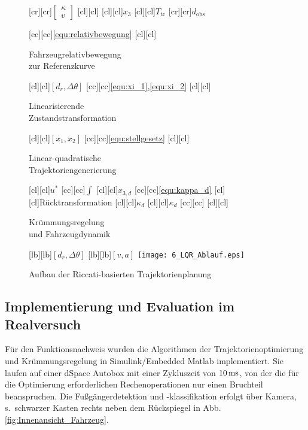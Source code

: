 \begin{figure}
\centering
	[cr][cr]{$\begin{bmatrix} \kappa \\ v \end{bmatrix}$}
	[cl][cl]{$$}
	[cl][cl]{$x_3$}
	[cl][cl]{$T_\text{tc}$}
	[cr][cr]{$d_\text{obs}$}
	
	[cc][cc]{\eqref{equ:relativbewegung}}%
	[cl][cl]{\parbox[t]{4cm}{Fahrzeugrelativbewegung \\ zur Referenzkurve}}
	[cl][cl]{$[d_r, \Delta\theta]$} %
	[cc][cc]{\eqref{equ:xi_1},\eqref{equ:xi_2}}
	[cl][cl]{\parbox[t]{3cm}{Linearisierende\\Zustandstransformation} }
	[cl][cl]{$[x_1, x_2]$}
	[cc][cc]{\eqref{equ:stellgesetz}} %
	[cl][cl]{\parbox[t]{4cm}{Linear-quadratische \\ Trajektoriengenerierung}}
	[cl][cl]{$u^\ast$}
	[cc][cc]{$\int$}
	[cl][cl]{$x_{3,d}$}
	[cc][cc]{\eqref{equ:kappa_d}}
	[cl][cl]{Rücktransformation}
	[cl][cl]{$\kappa_{d}$}
	[cl][cl]{$\kappa_d$}
	[cc][cc]{\zB \cite{urmson2008adu}}%
	[cl][cl]{\parbox[t]{4cm}{Krümmungsregelung \\ und Fahrzeugdynamik}}
	[lb][lb]{$[d_r,\!\Delta\theta]$}
	[lb][lb]{$[v,a]$}
	\centering
  	\texttt{[image: 6\_LQR\_Ablauf.eps]}
  \caption[Aufbau der Riccati-basierten Trajektorienplanung]{Aufbau der Riccati-basierten Trajektorienplanung }
  \label{fig:RiccatiAblauf}
\end{figure}


\subsection{Implementierung und Evaluation im Realversuch}\label{sec:eval}

%
Für den Funktionsnachweis wurden %
die Algorithmen der Trajektorienoptimierung und Krümmungsregelung in Simulink/Embedded Matlab implementiert. Sie laufen auf einer dSpace Autobox 
mit einer Zykluszeit von $\unit[10]{ms}$, von der die für die Optimierung erforderlichen Rechenoperationen nur einen Bruchteil beanspruchen. Die Fußgängerdetektion und -klassifikation erfolgt über Kamera, s.\ schwarzer Kasten rechts neben dem Rückspiegel in Abb.\,\ref{fig:Innenansicht_Fahrzeug}.

